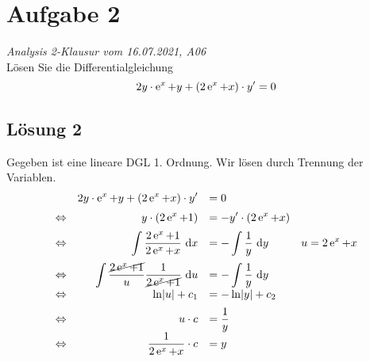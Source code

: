 \documentclass[main.tex]{subfiles}
\begin{document}
\section{Aufgabe 2}
\textit{Analysis 2-Klausur vom 16.07.2021, A06}\\
Lösen Sie die Differentialgleichung
\begin{equation*}
	2y \cdot \operatorname{\mathrm{e}}^x + y + (2\operatorname{\mathrm{e}}^x + x) \cdot y' = 0
\end{equation*}
\subsection{Lösung 2}
Gegeben ist eine lineare DGL 1. Ordnung. Wir lösen durch Trennung der Variablen.
\[\everymath={\displaystyle}\begin{array}{crll}
	   & 2y \cdot \e^x + y + \left(2\e^x + x\right) \cdot y' &= 0 & \\[2mm]
\equiv & y\cdot \left(2\e^x + 1\right) &= - y' \cdot \left(2\e^x + x\right) & \\[2mm]
\equiv & \int \frac{2\e^x + 1}{2\e^x + x} \dx{x} &= - \int \frac{1}{y} \dx{y} & u = 2\e^x+x \\[4mm]
\equiv & \int \frac{\cancel{2\e^x + 1}}{u} \frac{1}{\cancel{2\e^x+1}} \dx{u} &= - \int \frac{1}{y} \dx{y} \\[2mm]
\equiv & \ln\abs{u} + c_1 &= - \ln \abs{y} + c_2 \\[2mm]
\equiv & u \cdot c &= \frac{1}{y} \\[2mm]
\equiv & \frac{1}{2\e^x+x} \cdot c &= y
\end{array}\]
\end{document}
